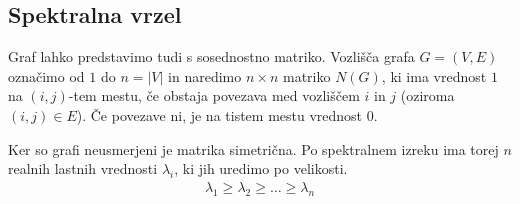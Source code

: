 \subsection{Spektralna vrzel}
Graf lahko predstavimo tudi s sosednostno matriko. Vozlišča grafa \(G=(V,E)\) označimo od \(1\) do \(n=\lvert V\rvert\) in naredimo \(n\times n\) matriko \(N(G)\), ki ima vrednost \(1\) na \((i,j)\)-tem mestu, če obstaja povezava med vozliščem \(i\) in \(j\) (oziroma \((i,j)\in E\)). Če povezave ni, je na tistem mestu vrednost \(0\).

Ker so grafi neusmerjeni je matrika simetrična. Po spektralnem izreku ima torej \(n\) realnih lastnih vrednosti \(\lambda_i\), ki jih uredimo po velikosti.
\begin{align*}
    \lambda_1 \geq \lambda_2 \geq \ldots \geq \lambda_n
\end{align*}

